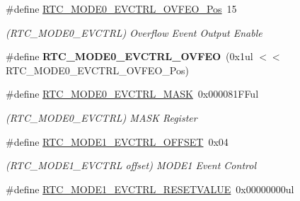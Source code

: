 \begin{DoxyCompactItemize}
\item 
\hypertarget{group___s_a_m_l21___r_t_c_ga785299b6b78fb2fb8e158d99cf05831b}{}\#define \hyperlink{group___s_a_m_l21___r_t_c_ga785299b6b78fb2fb8e158d99cf05831b}{R\+T\+C\+\_\+\+M\+O\+D\+E0\+\_\+\+E\+V\+C\+T\+R\+L\+\_\+\+O\+V\+F\+E\+O\+\_\+\+Pos}~15\label{group___s_a_m_l21___r_t_c_ga785299b6b78fb2fb8e158d99cf05831b}

\begin{DoxyCompactList}\small\item\em (R\+T\+C\+\_\+\+M\+O\+D\+E0\+\_\+\+E\+V\+C\+T\+R\+L) Overflow Event Output Enable \end{DoxyCompactList}\item 
\hypertarget{group___s_a_m_l21___r_t_c_gaa564a9f73ee6f1f9a790edc3dbf74a3a}{}\#define {\bfseries R\+T\+C\+\_\+\+M\+O\+D\+E0\+\_\+\+E\+V\+C\+T\+R\+L\+\_\+\+O\+V\+F\+E\+O}~(0x1ul $<$$<$ R\+T\+C\+\_\+\+M\+O\+D\+E0\+\_\+\+E\+V\+C\+T\+R\+L\+\_\+\+O\+V\+F\+E\+O\+\_\+\+Pos)\label{group___s_a_m_l21___r_t_c_gaa564a9f73ee6f1f9a790edc3dbf74a3a}

\item 
\hypertarget{group___s_a_m_l21___r_t_c_ga55b837245e3d0c897bb9d42b0d1b04e0}{}\#define \hyperlink{group___s_a_m_l21___r_t_c_ga55b837245e3d0c897bb9d42b0d1b04e0}{R\+T\+C\+\_\+\+M\+O\+D\+E0\+\_\+\+E\+V\+C\+T\+R\+L\+\_\+\+M\+A\+S\+K}~0x000081\+F\+Ful\label{group___s_a_m_l21___r_t_c_ga55b837245e3d0c897bb9d42b0d1b04e0}

\begin{DoxyCompactList}\small\item\em (R\+T\+C\+\_\+\+M\+O\+D\+E0\+\_\+\+E\+V\+C\+T\+R\+L) M\+A\+S\+K Register \end{DoxyCompactList}\item 
\hypertarget{group___s_a_m_l21___r_t_c_ga9c81fb51d590fbcc34e476ba2458c4a6}{}\#define \hyperlink{group___s_a_m_l21___r_t_c_ga9c81fb51d590fbcc34e476ba2458c4a6}{R\+T\+C\+\_\+\+M\+O\+D\+E1\+\_\+\+E\+V\+C\+T\+R\+L\+\_\+\+O\+F\+F\+S\+E\+T}~0x04\label{group___s_a_m_l21___r_t_c_ga9c81fb51d590fbcc34e476ba2458c4a6}

\begin{DoxyCompactList}\small\item\em (R\+T\+C\+\_\+\+M\+O\+D\+E1\+\_\+\+E\+V\+C\+T\+R\+L offset) M\+O\+D\+E1 Event Control \end{DoxyCompactList}\item 
\hypertarget{group___s_a_m_l21___r_t_c_ga2a8ab3bc81a30c0e7e2cc4d8d2d371c3}{}\#define \hyperlink{group___s_a_m_l21___r_t_c_ga2a8ab3bc81a30c0e7e2cc4d8d2d371c3}{R\+T\+C\+\_\+\+M\+O\+D\+E1\+\_\+\+E\+V\+C\+T\+R\+L\+\_\+\+R\+E\+S\+E\+T\+V\+A\+L\+U\+E}~0x00000000ul\label{group___s_a_m_l21___r_t_c_ga2a8ab3bc81a30c0e7e2cc4d8d2d371c3}


\end{DoxyCompactItemize}
